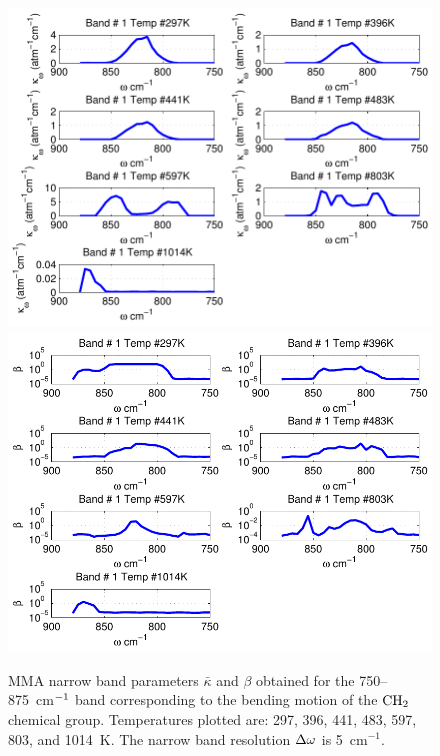 \begin{figure}[p]
\begin{center}
\includegraphics[width=5.0in]{Figures/MMA_Kappa_Band1_MALKMUS.pdf}
\includegraphics[width=5.0in]{Figures/MMA_Beta_Band1_MALKMUS.pdf}
\end{center}
\caption{MMA narrow band parameters $\bar{\kappa}$ and $\beta$ obtained for the 750--875~cm$\rm^{-1}$ band corresponding to the bending motion of the $\rm CH_2$ chemical group. Temperatures plotted are: 297, 396, 441, 483, 597, 803, and 1014~K. The narrow band resolution $\Delta \omega$ is 5~cm$^{-1}$.\label{fig:MMA_kappa_beta1}}
\end{figure}

